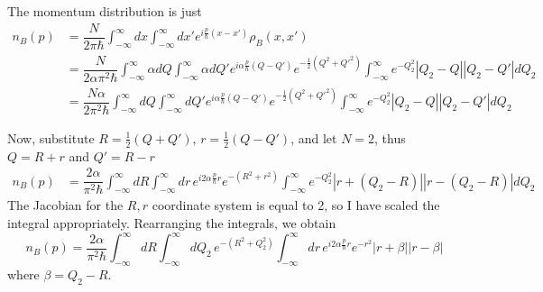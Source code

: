 \documentclass[onecolumn,english,aps,pra]{revtex4}
\begin{document}
The momentum distribution is just
\begin{align*}
n_{B}(p) &= \dfrac{N}{2 \pi \hbar} \int_{-\infty}^{\infty} dx \int_{-\infty}^{\infty} dx' e^{i \frac{p}{\hbar} (x - x')} \rho_{B}(x,x')\\
& = \dfrac{N}{2 \alpha \pi^2 \hbar} \int_{-\infty}^{\infty} \alpha dQ \int_{-\infty}^{\infty} \alpha dQ' e^{i \alpha \frac{p}{\hbar} (Q - Q')}  e^{-\frac{1}{2} (Q^2 + Q'^2)} \int_{-\infty}^{\infty} e^{-Q_{2}^{2}} |Q_{2} - Q| |Q_{2} - Q'| dQ_{2}\\
& = \dfrac{N\alpha }{2 \pi^2 \hbar} \int_{-\infty}^{\infty} dQ \int_{-\infty}^{\infty} dQ' e^{i \alpha \frac{p}{\hbar} (Q - Q')}  e^{-\frac{1}{2} (Q^2 + Q'^2)} \int_{-\infty}^{\infty} e^{-Q_{2}^{2}} |Q_{2} - Q| |Q_{2} - Q'| dQ_{2}
\end{align*}











Now, substitute $R = \frac{1}{2}(Q + Q')$, $r = \frac{1}{2}(Q - Q')$, and let $N = 2$, thus $Q = R + r$ and $Q' = R - r$
\begin{align*}
n_{B}(p) & = \dfrac{2\alpha }{\pi^2 \hbar} \int_{-\infty}^{\infty} dR \int_{-\infty}^{\infty} dr \, e^{i 2\alpha \frac{p}{\hbar} r}  e^{-(R^2 + r^2)} \int_{-\infty}^{\infty} e^{-Q_{2}^{2}} |r +(Q_{2} - R)| |r - (Q_{2} - R)| dQ_{2}
\end{align*}
The Jacobian for the $R, r$ coordinate system is equal to 2, so I have scaled the integral appropriately. Rearranging the integrals, we obtain
\begin{equation}
n_{B}(p) = \dfrac{2\alpha }{\pi^2 \hbar} \int_{-\infty}^{\infty} dR \int_{-\infty}^{\infty} dQ_{2} \,  e^{-(R^2 + Q_{2}^{2})} \int_{-\infty}^{\infty} dr \, e^{i 2\alpha \frac{p}{\hbar} r} e^{-r^2} |r + \beta| |r - \beta| 
\end{equation}
where $\beta = Q_{2} - R$. 
\end{document}
